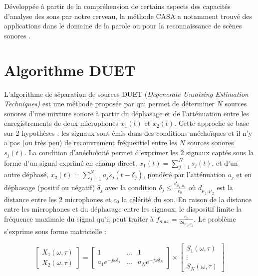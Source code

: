 Développée à partir de la compréhension de certains aspects des capacités d'analyse des sons par notre cerveau, la méthode CASA a notamment trouvé des applications dans le domaine de la parole \cite{ellis1999using, brown2005separation, shao2010computational} ou pour la reconnaissance de scènes sonores \cite{peltonen2002computational}. %

\section{Algorithme DUET}

L'algorithme de séparation de sources DUET (\textit{Degenerate Unmixing Estimation Techniques)} est une méthode proposée par \cite{rickard2007duet} qui permet de déterminer $N$ sources sonores d'une mixture sonore à partir du déphasage et de l'atténuation entre les enregistrements de deux microphones $x_1(t)$ et $x_2(t)$. Cette approche se base sur 2 hypothèses : les signaux sont émis dans des conditions anéchoïques et il n'y a pas (ou très peu) de recouvrement fréquentiel entre les $N$ sources sonores $s_j(t)$. La condition d'anéchoïcité permet d'exprimer les 2 signaux captés sous la forme d'un signal exprimé en champ direct, $x_1(t) = \sum_{j = 1}^{N}s_j(t)$, et d'un autre déphasé, $x_2(t) = \sum_{j = 1}^{N} a_j s_j(t-\delta_j)$, pondéré par l'atténuation $a_j$ et en déphasage (positif ou négatif) $\delta_j$ avec la condition $\delta_j \leqslant \frac{d_{\mu_1,\mu_2}}{c_0}$ où $d_{\mu_1,\mu_2}$ est la distance entre les 2 microphones et $c_0$ la célérité du son. En raison de la distance entre les microphones et du déphasage entre les signaux, le dispositif limite la fréquence maximale du signal qu'il peut traiter à $f_{max} = \frac{c_0}{2 d_{\mu_1,\mu_2}}$. Le problème s'exprime sous forme matricielle :

\begin{equation}\label{eq:algo-DUET}
\begin{bmatrix}
X_1(\omega,\tau) \\
X_2(\omega,\tau)
\end{bmatrix} =
\begin{bmatrix}
1 & \dots & 1 \\
a_1e^{-j\omega\delta_1} & \dots & a_Ne^{-j\omega\delta_N}
\end{bmatrix} \times
\begin{bmatrix}
S_1(\omega,\tau) \\
\vdots \\
S_N(\omega,\tau)
\end{bmatrix}
\end{equation}


